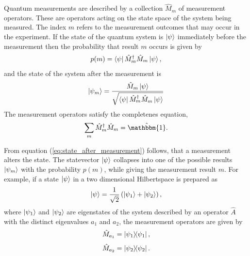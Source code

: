 	\begin{postulatebox}
		\begin{postulate}
			\label{post:qm_3}
			Quantum measurements are described by a collection $\hat{M}_m$ of measurement operators. These are operators acting on the state space of the system being measured. The index $m$ refers to the measurement outcomes that may occur in the experiment. If the state of the quantum system is $\ket{\psi}$ immediately before the measurement then the probability that result $m$ occurs is given by
			\begin{equation}
				\label{eq:measurement_probability}
				p(m)=\bra{\psi}\hat{M}_m^\dagger \hat{M}_m\ket{\psi},
			\end{equation}
			and the state of the system after the measurement is
			\begin{equation}
				\label{eq:state_after_measurement}
				\ket{\psi_m}=\frac{\hat{M}_m\ket{\psi}}{\sqrt{\bra{\psi}\hat{M}_m^\dagger \hat{M}_m\ket{\psi}}}
			\end{equation}
			The measurement operators satisfy the completenes equation,
			\begin{equation}
				\label{eq:measurement_completeness}
				\sum_{m}\hat{M}_m^\dagger \hat{M}_m=\hat{\mathbbm{1}}.
			\end{equation}
		\end{postulate}
	\end{postulatebox}
	From equation (\ref{eq:state_after_measurement}) follows, that a measurement alters the state. The statevector $\ket{\psi}$ collapses into one of the possible results $\ket{\psi_m}$ with the probability $p(m)$, while giving the measurement result $m$. For example, if a state $\ket{\psi}$ in a two dimensional Hilbertspace is prepared as
	\begin{equation}
		\label{eq:measurement_example_preparation}
		\ket{\psi}=\frac{1}{\sqrt{2}}\left(\ket{\psi_1}+\ket{\psi_2}\right),
	\end{equation}
	where $\ket{\psi_1}$ and $\ket{\psi_2}$ are eigenstates of the system described by an operator $\hat{A}$ with the distinct eigenvalues $a_1$ and $a_2$, the measurement operators are given by
	\begin{equation}
		\label{eq:example_measurement_operator_1}
		\hat{M}_{a_1}=\ketbra{\psi_1}{\psi_1},
	\end{equation}
	\begin{equation}
		\label{eq:example_measurement_operator_2}
		\hat{M}_{a_2}=\ketbra{\psi_2}{\psi_2}.
	\end{equation}
